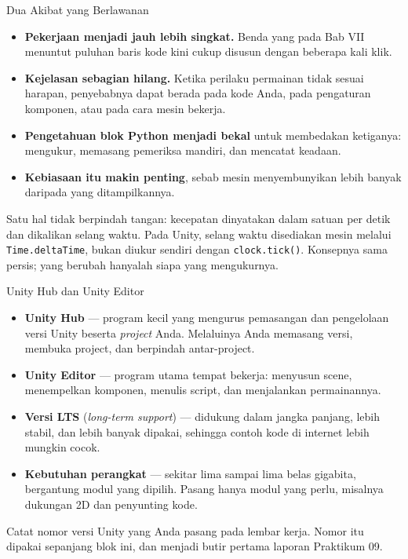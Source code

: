 \documentclass[aspectratio=169,10pt]{beamer}
\begin{document}
\begin{frame}{Dua Akibat yang Berlawanan}
\begin{itemize}
  \item \textbf{Pekerjaan menjadi jauh lebih singkat.} Benda yang pada Bab VII
        menuntut puluhan baris kode kini cukup disusun dengan beberapa kali
        klik.
  \item \textbf{Kejelasan sebagian hilang.} Ketika perilaku permainan tidak
        sesuai harapan, penyebabnya dapat berada pada kode Anda, pada
        pengaturan komponen, atau pada cara mesin bekerja.
  \item \textbf{Pengetahuan blok Python menjadi bekal} untuk membedakan
        ketiganya: mengukur, memasang pemeriksa mandiri, dan mencatat keadaan.
  \item \textbf{Kebiasaan itu makin penting}, sebab mesin menyembunyikan lebih
        banyak daripada yang ditampilkannya.
\end{itemize}
\vspace{0.16cm}
\begin{kotak}
Satu hal tidak berpindah tangan: kecepatan dinyatakan dalam satuan per detik
dan dikalikan selang waktu. Pada Unity, selang waktu disediakan mesin melalui
\texttt{Time.deltaTime}, bukan diukur sendiri dengan \texttt{clock.tick()}.
Konsepnya sama persis; yang berubah hanyalah siapa yang mengukurnya.
\end{kotak}
\end{frame}

\begin{frame}{Unity Hub dan Unity Editor}
\begin{itemize}
  \item \textbf{Unity Hub} --- program kecil yang mengurus pemasangan dan
        pengelolaan versi Unity beserta \emph{project} Anda. Melaluinya Anda
        memasang versi, membuka project, dan berpindah antar-project.
  \item \textbf{Unity Editor} --- program utama tempat bekerja: menyusun
        scene, menempelkan komponen, menulis script, dan menjalankan
        permainannya.
  \item \textbf{Versi LTS} (\emph{long-term support}) --- didukung dalam jangka
        panjang, lebih stabil, dan lebih banyak dipakai, sehingga contoh kode
        di internet lebih mungkin cocok.
  \item \textbf{Kebutuhan perangkat} --- sekitar lima sampai lima belas
        gigabita, bergantung modul yang dipilih. Pasang hanya modul yang perlu,
        misalnya dukungan 2D dan penyunting kode.
\end{itemize}
\vspace{0.12cm}
\begin{kiat}
Catat nomor versi Unity yang Anda pasang pada lembar kerja. Nomor itu dipakai
sepanjang blok ini, dan menjadi butir pertama laporan Praktikum 09.
\end{kiat}
\end{frame}
\end{document}
